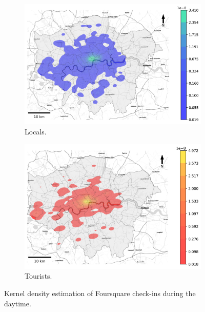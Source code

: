 \documentclass{article}
\theoremstyle{remark}
\begin{document}
\begin{figure}[!h]

\begin{subfigure}{0.5\textwidth}
\includegraphics[width=1\linewidth]{figures/kde_locals_daytime.png} 
\caption{Locals.}
\label{fig:kde_locals_daytime}
\end{subfigure}
\begin{subfigure}{0.5\textwidth}
\includegraphics[width=1\linewidth]{figures/kde_tourists_daytime.png}
\caption{Tourists.}
\label{fig:kde_tourists_daytime}
\end{subfigure}

\caption{Kernel density estimation of Foursquare check-ins during the daytime.} \label{fig:kde_daytime}
\end{figure}
\end{document}
